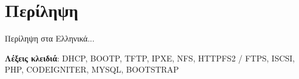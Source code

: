 \chapter*{Περίληψη}
Περίληψη στα Ελληνικά...

\vfill
\textbf{Λέξεις κλειδιά}: DHCP, BOOTP, TFTP, IPXE, NFS, HTTPFS2 / FTPS, ISCSI, PHP, CODEIGNITER, MYSQL, BOOTSTRAP